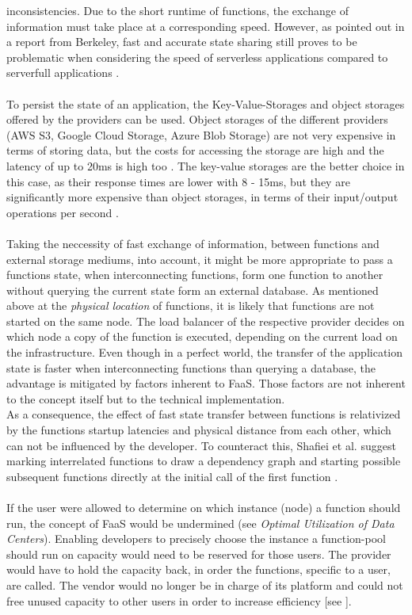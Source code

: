 \documentclass[a4paper,twoside,11pt, pagesize]{scrartcl}
\begin{document}
\begin{spacing}{1.2}
inconsistencies. Due to the short runtime of functions, the exchange of information must take place at a corresponding speed. However, as pointed out in a report from Berkeley, fast and accurate state sharing still proves to be problematic when considering the speed of serverless applications compared to serverfull applications \cite{jonas2019cloud}.\\\\ To persist the state of an application, the Key-Value-Storages and object storages offered by the providers can be used. Object storages of the different providers (AWS S3, Google Cloud Storage, Azure Blob Storage) are not very expensive in terms of storing data, but the costs for accessing the storage are high and the latency of up to 20ms is high too \cite{jonas2019cloud}. The key-value storages are the better choice in this case, as their response times are lower with 8 - 15ms, but they are significantly more expensive than object storages, in terms of their input/output operations per second \cite{jonas2019cloud}.\\\\ Taking the neccessity of fast exchange of information, between functions and external storage mediums, into account, it might be more appropriate to pass a functions state, when interconnecting functions, form one function to another without querying the current state form an external database. As mentioned above at the \textit{physical location} of functions, it is likely that functions are not started on the same node. The load balancer of the respective provider decides on which node a copy of the function is executed, depending on the current load on the infrastructure. Even though in a perfect world, the transfer of the application state is faster when interconnecting functions than querying a database, the advantage is mitigated by factors inherent to FaaS. Those factors are not inherent to the concept itself but to the technical implementation.\\ As a consequence, the effect of fast state transfer between functions is relativized by the functions startup latencies and physical distance from each other, which can not be influenced by the developer. To counteract this, Shaﬁei et al. suggest marking interrelated functions to draw a dependency graph and starting possible subsequent functions directly at the initial call of the first function \cite{shafiei2020serverless}.\\\\ If the user were allowed to determine on which instance (node) a function should run, the concept of FaaS would be undermined (see \textit{Optimal Utilization of Data Centers}). Enabling developers to precisely choose the instance a function-pool should run on capacity would need to be reserved for those users. The provider would have to hold the capacity back, in order the functions, specific to a user, are called. The vendor would no longer be in charge of its platform and could not free unused capacity to other users in order to increase efficiency [see \cite{fowler2018serverless}]. 

\end{spacing}
\end{document}
